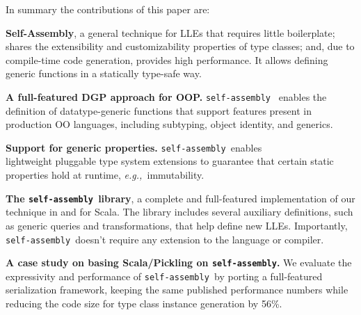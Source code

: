 \documentclass[preprint,nocopyrightspace]{sigplanconf}
\newcommand{\eg}{{\em e.g.,~}}
\newcommand{\selfassembly}{\texttt{self-assembly~}}
\newcommand{\sselfassembly}{\texttt{self-assembly}}
\begin{document}
In summary the contributions of this paper are:

\begin{itemize*}

\item {\bf Self-Assembly}, a general technique for LLEs that requires
  little boilerplate; shares the extensibility and customizability
  properties of type classes; and, due to compile-time
  code generation, provides high performance. It allows defining
  generic functions in a statically type-safe way.

\item {\bf A full-featured DGP approach for OOP.} \selfassembly
  enables the definition of datatype-generic functions that
  support features present in production OO languages, including
  subtyping, object identity, and generics.

\item {\bf Support for generic
  properties.} \selfassembly enables \\lightweight pluggable type system extensions
  to guarantee that certain static properties hold at
  runtime, \eg immutability.

\item {\bf The \selfassembly library}, a complete and full-featured
  implementation of our technique in and for Scala.
  The library includes several auxiliary definitions, such as
  generic queries and transformations, that help define new LLEs.
  Importantly, \selfassembly doesn't require any extension to the
  language or compiler.

\item {\bf A case study on basing Scala/Pickling on \sselfassembly.}
  We evaluate the expressivity and performance of \selfassembly by
  porting a full-featured serialization framework, keeping the same
  published performance numbers while reducing the code size for
  type class instance generation by 56\%.




\end{itemize*}
\end{document}
